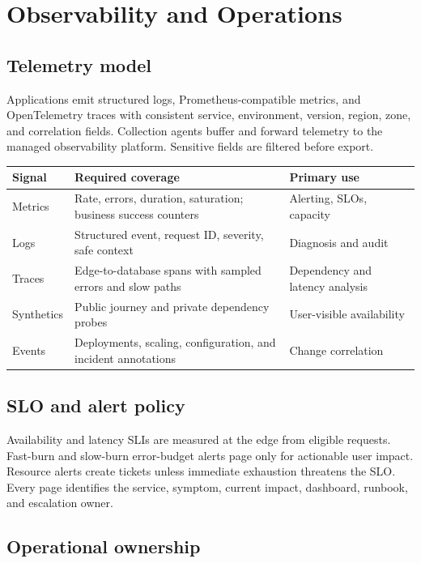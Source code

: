 \section{Observability and Operations}

\subsection{Telemetry model}

Applications emit structured logs, Prometheus-compatible metrics, and OpenTelemetry traces with consistent service, environment, version, region, zone, and correlation fields. Collection agents buffer and forward telemetry to the managed observability platform. Sensitive fields are filtered before export.

\begin{tabularx}{\textwidth}{@{}L{29mm}Y Y@{}}
  \toprule
  \color{white}\textbf{Signal} & \color{white}\textbf{Required coverage} & \color{white}\textbf{Primary use} \\
  \midrule
  Metrics & Rate, errors, duration, saturation; business success counters & Alerting, SLOs, capacity \\
  Logs & Structured event, request ID, severity, safe context & Diagnosis and audit \\
  Traces & Edge-to-database spans with sampled errors and slow paths & Dependency and latency analysis \\
  Synthetics & Public journey and private dependency probes & User-visible availability \\
  Events & Deployments, scaling, configuration, and incident annotations & Change correlation \\
  \bottomrule
\end{tabularx}

\subsection{SLO and alert policy}

Availability and latency SLIs are measured at the edge from eligible requests. Fast-burn and slow-burn error-budget alerts page only for actionable user impact. Resource alerts create tickets unless immediate exhaustion threatens the SLO. Every page identifies the service, symptom, current impact, dashboard, runbook, and escalation owner.

\subsection{Operational ownership}

